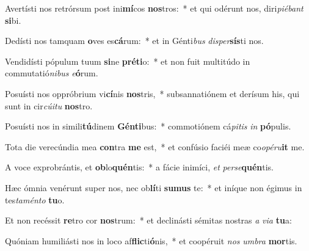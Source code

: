 \item Avertísti nos retrórsum post ini\textbf{mí}cos \textbf{nos}tros:~* et qui odérunt nos, diri\textit{pi}\textit{é}\textit{bant} \textbf{si}bi.
\item Dedísti nos tamquam \textbf{o}ves es\textbf{cá}rum:~* et in Génti\textit{bus} \textit{di}\textit{sper}\textbf{sís}ti nos.
\item Vendidísti pópulum tuum \textbf{si}ne \textbf{pré}\textbf{ti}o:~* et non fuit multitúdo in commutatió\textit{ni}\textit{bus} \textit{e}\textbf{ó}rum.
\item Posuísti nos oppróbrium vi\textbf{cí}nis \textbf{nos}tris,~* subsannatiónem et derísum his, qui sunt in cir\textit{cú}\textit{i}\textit{tu} \textbf{nos}tro.
\item Posuísti nos in simili\textbf{tú}dinem \textbf{Gén}\textbf{ti}bus:~* commotiónem cá\textit{pi}\textit{tis} \textit{in} \textbf{pó}pulis.
\item Tota die verecúndia mea \textbf{con}tra \textbf{me} est,~* et confúsio faciéi meæ co\textit{o}\textit{pé}\textit{ru}\textbf{it} me.
\item A voce exprobrántis, et \textbf{ob}lo\textbf{quén}tis:~* a fácie inimíci, \textit{et} \textit{per}\textit{se}\textbf{quén}tis.
\item Hæc ómnia venérunt super nos, nec ob\textbf{lí}ti \textbf{su}\textbf{mus} te:~* et iníque non égimus in tes\textit{ta}\textit{mén}\textit{to} \textbf{tu}o.
\item Et non recéssit \textbf{re}tro cor \textbf{nos}trum:~* et declinásti sémitas nostras \textit{a} \textit{vi}\textit{a} \textbf{tu}a:
\item Quóniam humiliásti nos in loco af\textbf{flic}ti\textbf{ó}nis,~* et coopéruit \textit{nos} \textit{um}\textit{bra} \textbf{mor}tis.
